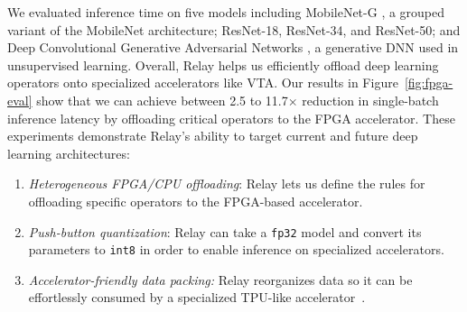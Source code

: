   We evaluated inference time on five models including MobileNet-G \citep{mobilenet}, a grouped variant of the MobileNet architecture; ResNet-18, ResNet-34, and ResNet-50\citep{resnet}; and Deep Convolutional Generative Adversarial Networks \citep{dcgan}, a generative DNN used in unsupervised learning.
  Overall, Relay helps us efficiently offload deep learning operators onto specialized accelerators like VTA.
  Our results in Figure~\ref{fig:fpga-eval} show that we can achieve between 2.5 to 11.7$\times$ reduction in single-batch inference latency by offloading critical operators to the FPGA accelerator.
  These experiments demonstrate Relay's ability to target current and future deep learning architectures:
  \begin{enumerate}
    \item \textit{Heterogeneous FPGA/CPU offloading}: Relay lets us define the rules for offloading specific operators to the FPGA-based accelerator.
    \item \textit{Push-button quantization}: Relay can take a \texttt{fp32} model and convert its parameters to \texttt{int8} in order to enable inference on specialized accelerators.
    \item \textit{Accelerator-friendly data packing:} Relay reorganizes data so it can be effortlessly consumed by a specialized TPU-like accelerator~\citep{tpuv1}.
  \end{enumerate}
